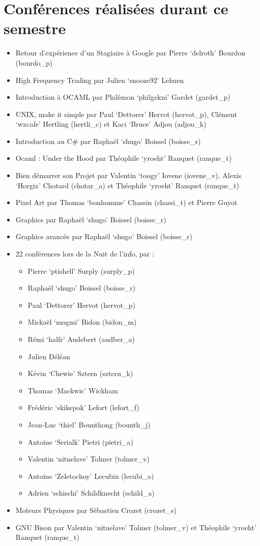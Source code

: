 \documentclass[12pt]{report}
\begin{document}
  \section{Conférences réalisées durant ce semestre}
  \begin{itemize}
    \item Retour d'expérience d'un Stagiaire à Google par Pierre `delroth' Bourdon (bourdo\_p)
    \item High Frequency Trading par Julien `snooze92' Lehuen
    \item Introduction à OCAML par Philémon `philgekni' Gardet (gardet\_p)
    \item UNIX, make it simple par Paul `Dettorer' Hervot (hervot\_p), Clément `wxcafe' Hertling (hertli\_c) et Kaci `Bruce' Adjou (adjou\_k)
    \item Introduction au C\# par Raphaël `shugo' Boissel (boisse\_r)
    \item Ocaml : Under the Hood par Théophile `yroeht' Ranquet (ranque\_t)
    \item Bien démarrer son Projet par Valentin `toogy' Iovene (iovene\_v), Alexis `Horgix' Chotard (chotar\_a) et Théophile `yroeht' Ranquet (ranque\_t)
    \item Pixel Art par Thomas `bonhomme' Chassin (chassi\_t) et Pierre Guyot
    \item Graphics par Raphaël `shugo' Boissel (boisse\_r)
    \item Graphics avancée par Raphaël `shugo' Boissel (boisse\_r)
    \item 22 conférences lors de la Nuit de l'info, par : \\
      \begin{itemize}
        \item Pierre `ptishell' Surply (surply\_p)
        \item Raphaël `shugo' Boissel (boisse\_r)
        \item Paul `Dettorer' Hervot (hervot\_p)
        \item Mickaël `mogmi' Bidon (bidon\_m)
        \item Rémi `halfr' Audebert (audber\_a)
        \item Julien Déléan
        \item Kévin `Chewie' Sztern (sztern\_k)
        \item Thomas `Mackwic' Wickham
        \item Frédéric `skikepok' Lefort (lefort\_f)
        \item Jean-Luc `thiel' Bounthong (bounth\_j)
        \item Antoine `Serialk' Pietri (pietri\_a)
        \item Valentin `nitnelave' Tolmer (tolmer\_v)
        \item Antoine `Zeletochoy' Lecubin (lecubi\_a)
        \item Adrien `schischi' Schildknecht (schild\_a)
      \end{itemize}
    \item Moteurs Physiques par Sébastien Crozet (crozet\_s)
    \item GNU Bison par Valentin `nitnelave' Tolmer (tolmer\_v) et Théophile `yroeht' Ranquet (ranque\_t)
  \end{itemize}
\end{document}
